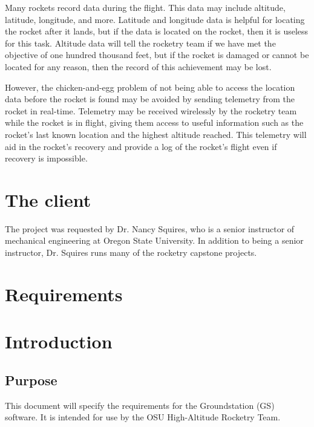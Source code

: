 \documentclass[10pt,draftclsnofoot,onecolumn]{IEEEtran}
\begin{document}
	Many rockets record data during the flight. This data may include
	altitude, latitude, longitude, and more.
	Latitude and longitude
	data is helpful for locating the rocket after it lands, but
	if the data is located on the rocket, then it is useless
	for this task.
	Altitude data will tell the rocketry team if we have
	met the objective of one hundred thousand feet, but if the rocket
	is damaged or cannot be located for any reason, then the record
	of this achievement may be lost.

	However, the chicken-and-egg problem of not being able to access
	the location data before the rocket is found may be avoided by sending
	telemetry from the rocket in real-time.
	Telemetry may be received wirelessly
	by the rocketry team while the rocket is in flight, giving them
	access to useful information such as the rocket's last known location
	and the highest altitude reached. This telemetry will aid in the
	rocket's recovery and provide a log of the rocket's flight even if
	recovery is impossible.




	\section{The client}
	The project was requested by Dr. Nancy Squires, who is a senior
	instructor of mechanical engineering at Oregon State University.
	In addition to being a senior instructor, Dr. Squires runs many
	of the rocketry capstone projects.





\section{Requirements}




	\section{Introduction}

	\subsection{Purpose}
	This document will specify the requirements for the Groundstation (GS) software.
	It is intended for use by the OSU High-Altitude Rocketry Team.

\end{document}
